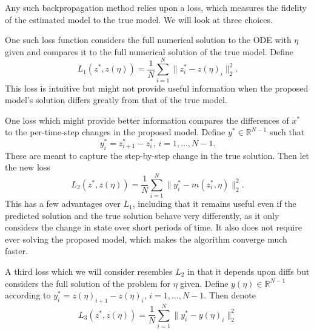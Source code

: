 \documentclass[12pt]{article}
\begin{document}
Any such backpropagation method relies upon a loss, which measures the fidelity of the estimated model to the true model. We will look at three choices.

One such loss function considers the full numerical solution to the ODE with $\eta$ given and compares it to the full numerical solution of the true model. Define $$ L_1(z^*, z(\eta)) = \frac{1}{N} \sum_{i=1}^N \|z_i^* - z(\eta)_i\|_2^2.$$ This loss is intuitive but might not provide useful information when the proposed model's solution differs greatly from that of the true model.

One loss which might provide better information compares the differences of $x^*$ to the per-time-step changes in the proposed model. Define $y^* \in \mathbb{R}^{N-1}$ such that $$ y^*_i = z^*_{i+1} - z^*_i,\, i = 1, \ldots , N-1. $$  These are meant to capture the step-by-step change in the true solution. Then let the new loss $$ L_2(z^*, z(\eta)) = \frac{1}{N} \sum_{i=1}^N \| y^*_i - m(z_i^*, \eta) \|^2_2. $$ This has a few advantages over $L_1$, including that it remains useful even if the predicted solution and the true solution behave very differently, as it only considers the change in state over short periods of time. It also does not require ever solving the proposed model, which makes the algorithm converge much faster.

A third loss which we will consider resembles $L_2$ in that it depends upon diffs but considers the full solution of the problem for $\eta$ given. Define $y(\eta) \in \mathbb{R}^{N-1}$ according to $y^*_i = z(\eta)_{i+1} - z(\eta)_i,\, i = 1, \ldots , N-1$. Then denote $$ L_3(z^*, z(\eta)) = \frac{1}{N} \sum_{i=1}^N \|y^*_i - y(\eta)_i\|_2^2 $$



\end{document}
